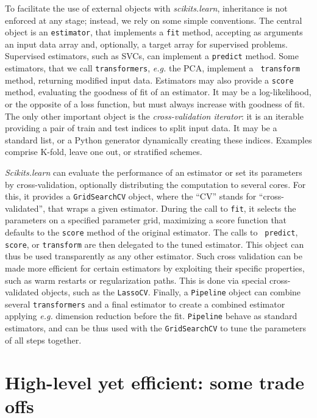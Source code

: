 \documentclass[twoside,11pt]{article}
\begin{document}
%
To facilitate the use of external objects with \emph{scikits.learn},
inheritance is not enforced at any stage; instead, we rely on some simple
conventions. The central object is an {\tt estimator}, that implements a
{\tt fit} method, accepting as arguments an input data array and,
optionally, a target array for supervised problems. Supervised estimators,
such as SVCs, can implement a {\tt predict} method. Some estimators,
that we call {\tt transformers}, \emph{e.g.} the PCA, implement a {\tt
transform} method, returning modified input data.
%
Estimators may also provide a {\tt score} method, evaluating the goodness
of fit of an estimator. It may be a log-likelihood, or the opposite of a
loss function, but must always increase with goodness of fit.
%
The only other important object is the \emph{cross-validation iterator}:
it is an iterable providing a pair of train and test indices to split input
data. It may be a standard list, or a Python generator dynamically
creating these indices. Examples comprise K-fold, leave one out, or
stratified schemes. 


\smallskip {}
%
\emph{Scikits.learn} can evaluate the performance of an estimator or set
its parameters by cross-validation, optionally distributing the
computation to several cores. For this, it provides a {\tt GridSearchCV}
object, where the ``CV'' stands for ``cross-validated'', that wraps a
given estimator. During the call to {\tt fit}, it selects the parameters
on a specified parameter grid, maximizing a score function that defaults
to the {\tt score} method of the original estimator. The calls to {\tt
predict}, {\tt score}, or {\tt transform} are then delegated to the tuned
estimator. This object can thus be used transparently as any other
estimator. Such cross validation can be made more efficient for certain
estimators by exploiting their specific properties, such as warm restarts
or regularization paths. This is done via special cross-validated
objects, such as the {\tt LassoCV}. Finally, a {\tt Pipeline} object can
combine several {\tt transformers} and a final estimator to create a
combined estimator applying \emph{e.g.} dimension reduction before the
fit. {\tt Pipeline} behave as standard estimators, and can be thus used
with the {\tt GridSearchCV} to tune the parameters of all steps together.

\section{High-level yet efficient: some trade offs}
\end{document}
